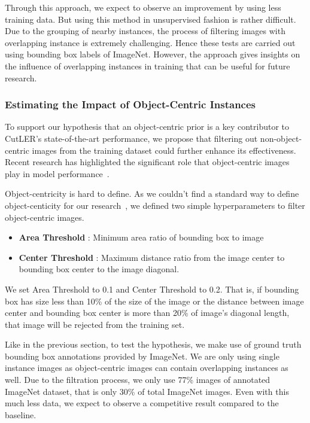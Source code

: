 Through this approach, we expect to observe an improvement by using less training data. But using this method in unsupervised fashion is rather difficult. Due to the grouping of nearby instances, the process of filtering images with overlapping instance is extremely challenging. Hence these tests are carried out using bounding box labels of ImageNet. However, the approach gives insights on the influence of overlapping instances in training that can be useful for future research.

\subsubsection{Estimating the Impact of Object-Centric Instances}
\label{section:analysis_oc_instancs}
To support our hypothesis that an object-centric prior is a key contributor to CutLER's state-of-the-art performance, we propose that filtering out non-object-centric images from the training dataset could further enhance its effectiveness. Recent research has highlighted the significant role that object-centric images play in model performance~\cite{engstler2023understanding, Gasparim_2021}.
	
Object-centricity is hard to define. As we couldn't find a standard way to define object-centicity for our research~\cite{Russakovsky, Gasparim_2021}, we defined two simple hyperparameters to filter object-centric images.

\begin{itemize}
	\item \textbf{Area Threshold} : Minimum area ratio of bounding box to image
	\item \textbf{Center Threshold} : Maximum distance ratio from the image center to bounding box center to the image diagonal.
\end{itemize}

We set Area Threshold to 0.1 and Center Threshold to 0.2. That is, if bounding box has size less than 10\% of the size of the image or the distance between image center and bounding box center is more than 20\% of image's diagonal length, that image will be rejected from the training set.

Like in the previous section, to test the hypothesis, we make use of ground truth bounding box annotations provided by ImageNet. We are only using single instance images as object-centric images can contain overlapping instances as well. Due to the filtration process, we only use 77\% images of annotated ImageNet dataset, that is only 30\% of total ImageNet images. Even with this much less data, we expect to observe a competitive result compared to the baseline. 

